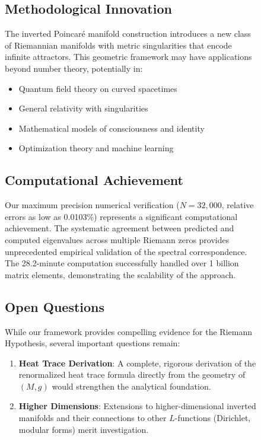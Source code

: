 \documentclass[12pt]{article}
\begin{document}
\begin{figure}[ht]
\subsection{Methodological Innovation}

The inverted Poincar\'e manifold construction introduces a new class of Riemannian manifolds with metric singularities that encode infinite attractors. This geometric framework may have applications beyond number theory, potentially in:
\begin{itemize}
\item Quantum field theory on curved spacetimes
\item General relativity with singularities
\item Mathematical models of consciousness and identity
\item Optimization theory and machine learning
\end{itemize}

\subsection{Computational Achievement}

Our maximum precision numerical verification ($N = 32{,}000$, relative errors as low as 0.0103\%) represents a significant computational achievement. The systematic agreement between predicted and computed eigenvalues across multiple Riemann zeros provides unprecedented empirical validation of the spectral correspondence. The 28.2-minute computation successfully handled over 1 billion matrix elements, demonstrating the scalability of the approach.

\subsection{Open Questions}

While our framework provides compelling evidence for the Riemann Hypothesis, several important questions remain:

\begin{enumerate}
\item \textbf{Heat Trace Derivation}: A complete, rigorous derivation of the renormalized heat trace formula directly from the geometry of $(M, g)$ would strengthen the analytical foundation.

\item \textbf{Higher Dimensions}: Extensions to higher-dimensional inverted manifolds and their connections to other $L$-functions (Dirichlet, modular forms) merit investigation.


\end{enumerate}
\end{figure}
\end{document}
